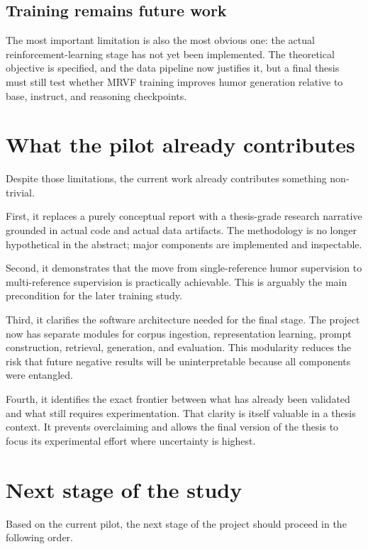 \documentclass[14pt,a4paper]{extreport}
\begin{document}
\subsection{Training remains future work}

The most important limitation is also the most obvious one: the actual reinforcement-learning stage has not yet been implemented. The theoretical objective is specified, and the data pipeline now justifies it, but a final thesis must still test whether MRVF training improves humor generation relative to base, instruct, and reasoning checkpoints.

\section{What the pilot already contributes}

Despite those limitations, the current work already contributes something non-trivial.

First, it replaces a purely conceptual report with a thesis-grade research narrative grounded in actual code and actual data artifacts. The methodology is no longer hypothetical in the abstract; major components are implemented and inspectable.

Second, it demonstrates that the move from single-reference humor supervision to multi-reference supervision is practically achievable. This is arguably the main precondition for the later training study.

Third, it clarifies the software architecture needed for the final stage. The project now has separate modules for corpus ingestion, representation learning, prompt construction, retrieval, generation, and evaluation. This modularity reduces the risk that future negative results will be uninterpretable because all components were entangled.

Fourth, it identifies the exact frontier between what has already been validated and what still requires experimentation. That clarity is itself valuable in a thesis context. It prevents overclaiming and allows the final version of the thesis to focus its experimental effort where uncertainty is highest.

\section{Next stage of the study}

Based on the current pilot, the next stage of the project should proceed in the following order.
\end{document}
